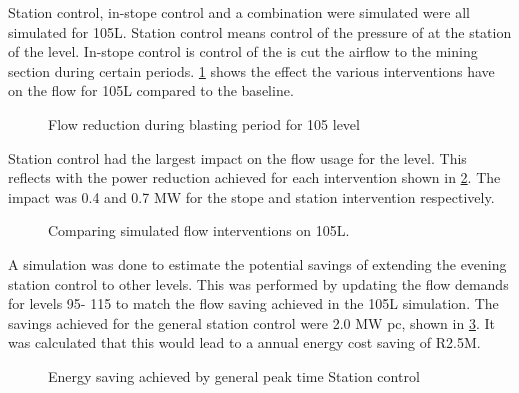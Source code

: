 	\clearpage
	Station control, in-stope control and a combination were simulated were all simulated for 105L. Station control means control of the pressure of at the station of the level. In-stope control is control of the is cut the airflow to the mining section during certain periods. \cref{fig: 105 Flow savings} shows the effect the various interventions have on  the flow for 105L compared to the baseline.

	\begin{figure}[h!]
		\centering
		
		\caption{Flow reduction during blasting period for 105 level}
		\label{fig: 105 Flow savings}
	\end{figure}
Station control had the largest impact on the flow usage for the level. This reflects with the power reduction achieved for each intervention shown in \cref{fig: Station vs stope}. The impact was 0.4 and 0.7 MW for the stope and station intervention respectively.
	
	\begin{figure}[h!]
		\centering
		
		\caption{Comparing simulated flow interventions on 105L.}
		\label{fig: Station vs stope}
	\end{figure}
A simulation was done to estimate the potential savings of extending the evening station control to other levels. This was performed by updating the flow demands for levels 95- 115 to match the flow saving achieved in the 105L simulation. The savings achieved for the general station control were 2.0 MW \gls{pc}, shown in \cref{fig: General station optimise}. It was calculated that this would lead to a annual energy cost saving of R2.5M.
\begin{figure}[h!]
	\centering
	
	\caption{Energy saving achieved by general peak time Station control }
	\label{fig: General station optimise}
\end{figure}
